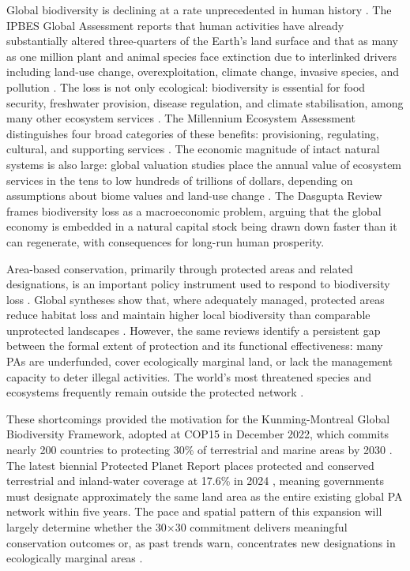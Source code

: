 \documentclass[12pt]{article}
\theoremstyle{break}
\begin{document}
Global biodiversity is declining at a rate unprecedented in human history
\citep{diaz2019}. The IPBES Global Assessment reports that human activities have already
substantially altered three-quarters of the Earth's land surface and that as many as
one million plant and animal species face extinction due to interlinked
drivers including land-use change, overexploitation, climate change, invasive species, and
pollution \citep{ipbes2019}.
The loss is not only ecological: biodiversity is essential for food security,
freshwater provision, disease regulation, and climate stabilisation, among many other
ecosystem services \citep{diaz2018}.
The Millennium Ecosystem Assessment distinguishes four broad categories of these
benefits: provisioning, regulating, cultural, and supporting services
\citep{mea2005}.
The economic magnitude of intact natural systems is also large: global valuation
studies place the annual value of ecosystem services in the tens to low hundreds of
trillions of dollars, depending on assumptions about biome values and land-use change
\citep{costanza1997, costanza2014, kubiszewski2017}.
The Dasgupta Review \citep{dasgupta2021} frames biodiversity loss as a macroeconomic
problem, arguing that the global economy is embedded in a natural capital stock
being drawn down faster than it can regenerate, with consequences for long-run human
prosperity.

Area-based conservation, primarily through protected areas and related designations,
is an important policy instrument used to respond to biodiversity loss
\citep{maxwell2020}. Global syntheses show that, where adequately managed, protected
areas reduce habitat loss and maintain higher local biodiversity than comparable
unprotected landscapes \citep{watson2014, gray2016}. However, the
same reviews identify a persistent gap between the formal extent of protection and its
functional effectiveness: many PAs are underfunded, cover ecologically marginal land,
or lack the management capacity to deter illegal activities. The world's most
threatened species and ecosystems frequently remain outside the protected network
\citep{williams2022, chaplin2023}.

These shortcomings provided the motivation for the Kunming-Montreal Global Biodiversity
Framework, adopted at COP15 in December 2022, which commits nearly 200 countries to
protecting 30\% of terrestrial and marine areas by 2030 \citep{cbd2022}. The
latest biennial Protected Planet Report places protected and conserved terrestrial and
inland-water coverage at 17.6\% in 2024 \citep{unepwcmc2024},
meaning governments must designate approximately the same land area as the entire
existing global PA network within five years. The pace and spatial pattern of this
expansion will largely determine whether the 30$\times$30 commitment delivers
meaningful conservation outcomes or, as past trends warn, concentrates new
designations in ecologically marginal areas \citep{joppa2009, venter2018}.
\end{document}
